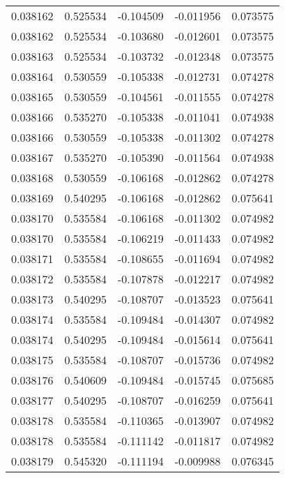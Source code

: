 \begin{tabular}{lrrrr}
0.038162    &  0.525534 & -0.104509 & -0.011956 &             0.073575 \\
0.038162    &  0.525534 & -0.103680 & -0.012601 &             0.073575 \\
0.038163    &  0.525534 & -0.103732 & -0.012348 &             0.073575 \\
0.038164    &  0.530559 & -0.105338 & -0.012731 &             0.074278 \\
0.038165    &  0.530559 & -0.104561 & -0.011555 &             0.074278 \\
0.038166    &  0.535270 & -0.105338 & -0.011041 &             0.074938 \\
0.038166    &  0.530559 & -0.105338 & -0.011302 &             0.074278 \\
0.038167    &  0.535270 & -0.105390 & -0.011564 &             0.074938 \\
0.038168    &  0.530559 & -0.106168 & -0.012862 &             0.074278 \\
0.038169    &  0.540295 & -0.106168 & -0.012862 &             0.075641 \\
0.038170    &  0.535584 & -0.106168 & -0.011302 &             0.074982 \\
0.038170    &  0.535584 & -0.106219 & -0.011433 &             0.074982 \\
0.038171    &  0.535584 & -0.108655 & -0.011694 &             0.074982 \\
0.038172    &  0.535584 & -0.107878 & -0.012217 &             0.074982 \\
0.038173    &  0.540295 & -0.108707 & -0.013523 &             0.075641 \\
0.038174    &  0.535584 & -0.109484 & -0.014307 &             0.074982 \\
0.038174    &  0.540295 & -0.109484 & -0.015614 &             0.075641 \\
0.038175    &  0.535584 & -0.108707 & -0.015736 &             0.074982 \\
0.038176    &  0.540609 & -0.109484 & -0.015745 &             0.075685 \\
0.038177    &  0.540295 & -0.108707 & -0.016259 &             0.075641 \\
0.038178    &  0.535584 & -0.110365 & -0.013907 &             0.074982 \\
0.038178    &  0.535584 & -0.111142 & -0.011817 &             0.074982 \\
0.038179    &  0.545320 & -0.111194 & -0.009988 &             0.076345 \\

\end{tabular}
